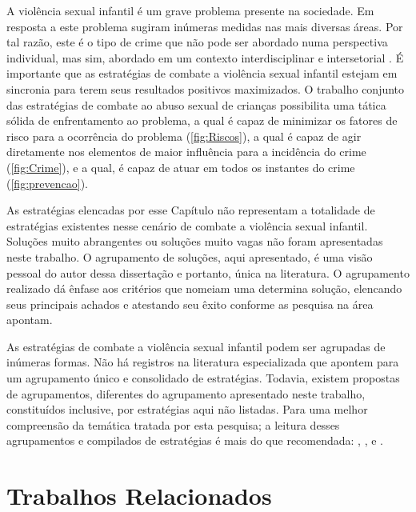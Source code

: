 A violência sexual infantil é um grave problema presente na sociedade. Em resposta a este problema sugiram inúmeras medidas nas mais diversas áreas. Por tal razão, este é o tipo de crime que não pode ser abordado numa perspectiva individual, mas sim, abordado em um contexto interdisciplinar e intersetorial \cite{maria2010papel, pinto2017avaliaccao}. É importante que as estratégias de combate a violência sexual infantil estejam em sincronia para terem seus resultados positivos maximizados. O trabalho conjunto das estratégias de combate ao abuso sexual de crianças possibilita uma tática sólida de enfrentamento ao problema, a qual é capaz de minimizar os fatores de risco para a ocorrência do problema (\autoref{fig:Riscos}), a qual é capaz de agir diretamente nos elementos de maior influência para a incidência do crime (\autoref{fig:Crime}), e a qual, é capaz de atuar em todos os instantes do crime (\autoref{fig:prevencao}).

As estratégias elencadas por esse Capítulo não representam a totalidade de estratégias existentes nesse cenário de combate a violência sexual infantil. Soluções muito abrangentes ou soluções muito vagas não foram apresentadas neste trabalho. O agrupamento de soluções, aqui apresentado, é uma visão pessoal do autor dessa dissertação e portanto, única na literatura. O agrupamento realizado dá ênfase aos critérios que nomeiam uma determina solução, elencando seus principais achados e atestando seu êxito conforme as pesquisa na área apontam.

As estratégias de combate a violência sexual infantil podem ser agrupadas de inúmeras formas. Não há registros na literatura especializada que apontem para um agrupamento único e consolidado de estratégias. Todavia, existem propostas de agrupamentos, diferentes do agrupamento apresentado neste trabalho, constituídos inclusive, por estratégias aqui não listadas. Para uma melhor compreensão da temática tratada por esta pesquisa; a leitura desses agrupamentos e compilados de estratégias é mais do que recomendada: , ,  e .


\chapter{Trabalhos Relacionados}\label{ssec:TR}

